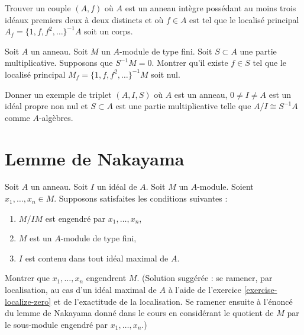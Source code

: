 \begin{exercise}
\label{exercise-localization-is-field}
Trouver un couple $(A, f)$ où $A$ est un anneau intègre possédant au moins trois idéaux
premiers deux à deux distincts et où $f \in A$ est tel que le localisé
principal $A_f = \{1, f, f^2, \ldots \}^{-1}A$ soit un corps.
\end{exercise}

\begin{exercise}
\label{exercise-localize-finite-module-zero}
Soit $A$ un anneau. Soit $M$ un $A$-module de type fini. Soit $S \subset A$
une partie multiplicative. Supposons que $S^{-1}M = 0$. Montrer qu'il
existe $f \in S$ tel que le localisé principal
$M_f = \{1, f, f^2, \ldots \}^{-1}M$ soit nul.
\end{exercise}
\begin{exercise}
\label{exercise-localization-is-quotient}
Donner un exemple de triplet $(A, I, S)$ où $A$ est un anneau,
$0 \not = I \not = A$ est un idéal propre non nul et $S \subset A$
est une partie multiplicative
telle que $A/I \cong S^{-1}A$ comme $A$-algèbres.
\end{exercise}




\section{Lemme de Nakayama}
\label{section-nakayama}

\begin{exercise}
\label{exercise-nakayama}
Soit $A$ un anneau.
Soit $I$ un idéal de $A$.
Soit $M$ un $A$-module.
Soient $x_1, \ldots, x_n \in M$.
Supposons satisfaites les conditions suivantes :
\begin{enumerate}
\item $M/IM$ est engendré par $x_1, \ldots, x_n$,
\item $M$ est un $A$-module de type fini,
\item $I$ est contenu dans tout idéal maximal de $A$.
\end{enumerate}
Montrer que $x_1, \ldots, x_n$ engendrent $M$. (Solution suggérée :
se ramener, par localisation, au cas d'un idéal maximal de $A$ à l'aide de
l'exercice \ref{exercise-localize-zero} et de l'exactitude de la localisation.
Se ramener ensuite à l'énoncé du lemme de Nakayama donné dans le cours
en considérant le quotient de $M$ par le sous-module engendré par
$x_1, \ldots, x_n$.)
\end{exercise}






